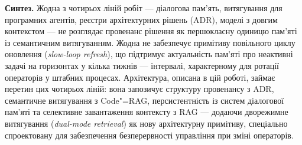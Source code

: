 
\medskip
\noindent\textbf{Синтез.}
Жодна з чотирьох ліній робіт --- діалогова пам'ять, витягування для програмних
агентів, реєстри архітектурних рішень (ADR), моделі з довгим контекстом ---
не розглядає провенанс рішення як першокласну одиницю пам'яті із семантичним
витягуванням.
Жодна не забезпечує примітиву повільного циклу оновлення (\emph{slow-loop refresh}),
що підтримує актуальність пам'яті про неактивні задачі на горизонтах у кілька
тижнів --- інтервалі, характерному для ротації операторів у штабних процесах.
Архітектура, описана в цій роботі, займає перетин цих чотирьох ліній:
вона запозичує структуру провенансу з ADR, семантичне витягування
з Code"=RAG, персистентність із систем діалогової пам'яті та селективне
завантаження контексту з RAG --- додаючи дворежимне витягування
(\emph{dual-mode retrieval}) як нову архітектурну примітиву, спеціально
спроектовану для забезпечення безперервності управління при зміні операторів.
